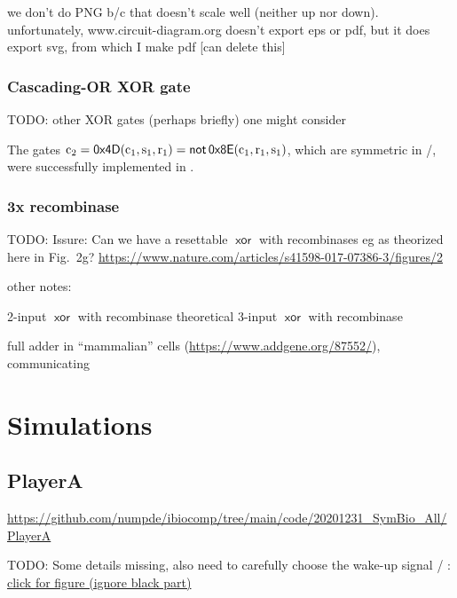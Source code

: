 \documentclass[12pt,notitlepage]{article}
\newcommand{\TODO}[1]{\textrm{\color{red}TODO: #1}}
\newcommand{\NOT}{\ensuremath{\mathop{\mathsf{not}}}\xspace}
\newcommand{\XOR}{\ensuremath{\mathop{\mathsf{xor}}}\xspace}
\newcommand{\ra}[1]{{\color{Blue}#1}}
\begin{document}
\ra{we don't do PNG b/c that doesn't scale well (neither up nor down). unfortunately, www.circuit-diagram.org doesn't export eps or pdf, but it does export svg, from which I make pdf [can delete this]}

\subsubsection*{Cascading-OR XOR gate}

\TODO{other XOR gates (perhaps briefly) one might consider}


The gates
$
	\ce{c_2} 
	=
	\mathop{\mathsf{0x4D}}
	(\ce{c_1}, \ce{s_1}, \ce{r_1}) 
	=
	\NOT
	\mathop{\mathsf{0x8E}}
	(\ce{c_1}, \ce{r_1}, \ce{s_1})
$,
which are
symmetric in /,
were successfully
implemented in \cite{NielsenETAL2016}.
%
%


\subsubsection*{3x recombinase}


\TODO{
\ra{Issure:} Can we have a resettable \XOR with recombinases
eg as theorized here in Fig.~2g?
\url{https://www.nature.com/articles/s41598-017-07386-3/figures/2}
}


\ra{other notes:}

\ra{2-input \XOR with recombinase \cite{BonnetETAL2013}}
\ra{theoretical 3-input \XOR with recombinase \cite{ChiuJiang2017}}

\ra{full adder in ``mammalian'' cells \cite{WeinbergETAL2017} (\url{https://www.addgene.org/87552/}),
communicating \cite{AuslaenderETAL2017}}

%






\section{Simulations}

\subsection{PlayerA}

\url{https://github.com/numpde/ibiocomp/tree/main/code/20201231_SymBio_All/PlayerA}

\TODO{Some details missing, also need to carefully choose the wake-up signal \ce{w_A} / \ce{w_B}:
\href{https://drive.google.com/file/d/1X1uEVNkUiXZqNz7C7m36YjW-g1XctIH0}{click for figure (ignore black part)}}
\end{document}
